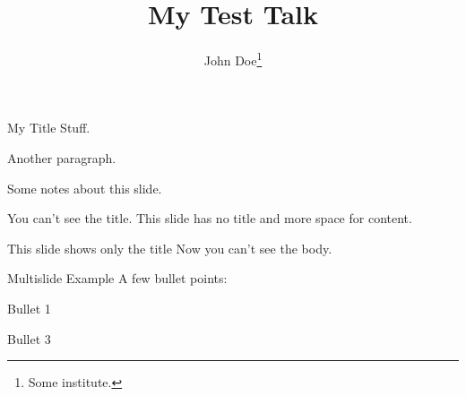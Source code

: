 \documentclass[12pt,screen]{talk}
\title{My Test Talk}
\author[John Doe]{John Doe\thanks{Some institute.}}
\begin{document}
\maketitleslide

\begin{slide}{My Title}
  Stuff.

  Another paragraph.
\end{slide}

\begin{notes}
  Some notes about this slide.
\end{notes}

\begin{slide}[notitle]{You can't see the title.}
  This slide has no title and more space for content.
\end{slide}

\begin{slide}[onlytitle]{This slide shows only the title}
  Now you can't see the body.
\end{slide}

\begin{multislide}{3}{Multislide Example}
  A few bullet points:
  \begin{itemize}
  \item Bullet 1
  {\item Bullet 3}
  \end{itemize}
\end{multislide}
\end{document}
